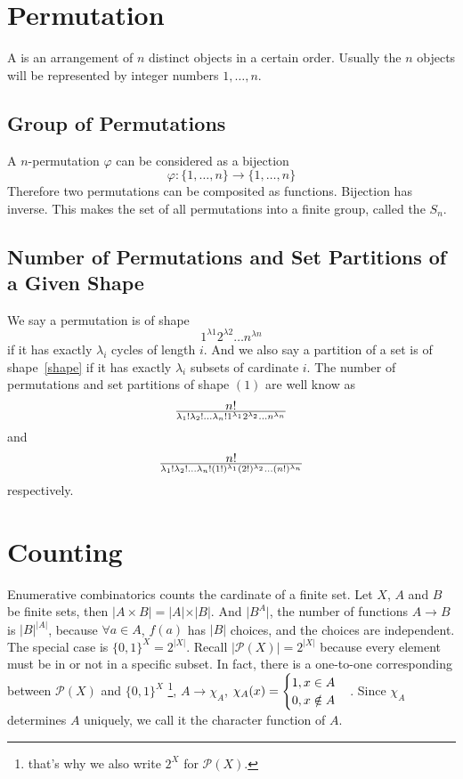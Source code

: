 \section{Permutation}
A  is an arrangement of $n$ distinct objects in a certain order.
Usually the $n$ objects will be represented by integer numbers $1, \dots, n$.

\subsection{Group of Permutations}
A $n$-permutation $\varphi$ can be considered as a bijection
$$\varphi : \{1, \dots, n\} \to \{1, \dots, n\}$$
Therefore two permutations can be composited as functions.
Bijection has inverse. This makes the set of all permutations into a finite group,
called the  $S_n$.

\subsection{Number of Permutations and Set Partitions of a Given Shape}
We say a permutation is of shape
$$1^{\lambda 1}2^{\lambda 2} \dots n^{\lambda n} \label{shape}$$
if it has exactly $\lambda_i$ cycles of length $i$.
And we also say a partition of a set is of shape~\ref{shape}
if it has exactly $\lambda_i$ subsets of cardinate $i$.
The number of permutations and set partitions of shape $(1)$
are well know as
$$n! \over \lambda_1! \lambda_2! \dots \lambda_n!
		1^{\lambda_1} 2^{\lambda_2} \dots n^{\lambda_n}$$
and
$$n! \over \lambda_1! \lambda_2! \dots \lambda_n!
		(1!)^{\lambda_1} (2!)^{\lambda_2} \dots (n!)^{\lambda_n}$$
respectively.

\section{Counting}
Enumerative combinatorics counts the cardinate of a finite set.
Let $X$, $A$ and $B$ be finite sets, then $\vert A\times B\vert=\vert A\vert \times \vert B\vert$.
And $\vert B^{A}\vert$, the number of functions $A\to B$ is $\vert B\vert^{\vert A\vert}$,
because $\forall a\in A$, $f(a)$ has $\vert B\vert$ choices, and the choices are independent.
The special case is $\{0,1\}^{X}=2^{\vert X\vert}$. Recall $\vert \mathcal{P}(X)\vert=2^{\vert X\vert}$
because every element must be in or not in a specific subset.
In fact, there is a one-to-one corresponding between $\mathcal{P}(X)$ and $\{0,1\}^{X}$
\footnote{that's why we also write $2^{X}$ for $\mathcal{P}(X)$.},
$A \to \chi_A$, $\chi_A(x)=\begin{cases}1, x\in A\cr 0, x\notin A\end{cases}$.
Since $\chi_A$ determines $A$ uniquely, we call it the character function of $A$.

